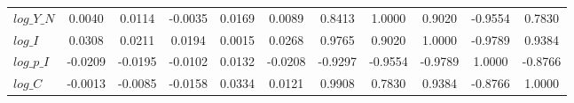 \begin{center}
\begin{longtable}{lcccccccccc}
$log\_Y\_N  $	 & 	       0.0040	 & 	       0.0114	 & 	      -0.0035	 & 	       0.0169	 & 	       0.0089	 & 	       0.8413	 & 	       1.0000	 & 	       0.9020	 & 	      -0.9554	 & 	       0.7830 \\ 
$log\_I     $	 & 	       0.0308	 & 	       0.0211	 & 	       0.0194	 & 	       0.0015	 & 	       0.0268	 & 	       0.9765	 & 	       0.9020	 & 	       1.0000	 & 	      -0.9789	 & 	       0.9384 \\ 
$log\_p\_I  $	 & 	      -0.0209	 & 	      -0.0195	 & 	      -0.0102	 & 	       0.0132	 & 	      -0.0208	 & 	      -0.9297	 & 	      -0.9554	 & 	      -0.9789	 & 	       1.0000	 & 	      -0.8766 \\ 
$log\_C     $	 & 	      -0.0013	 & 	      -0.0085	 & 	      -0.0158	 & 	       0.0334	 & 	       0.0121	 & 	       0.9908	 & 	       0.7830	 & 	       0.9384	 & 	      -0.8766	 & 	       1.0000 \\ 
\end{longtable}
 \end{center}
